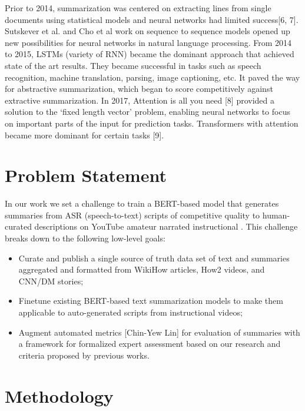 \documentclass{article}
\begin{document}
Prior to 2014, summarization was centered on extracting lines from single documents using statistical models and neural networks had limited success[6, 7]. Sutskever et al. and Cho et al work on sequence to sequence models opened up new possibilities for neural networks in natural language processing. From 2014 to 2015, LSTMs (variety of RNN) became the dominant approach that achieved state of the art results. They became successful in tasks such as speech recognition, machine translation, parsing, image captioning, etc. It paved the way for abstractive summarization, which began to score competitively against extractive summarization. In 2017, Attention is all you need [8] provided a solution to the ‘fixed length vector’ problem, enabling neural networks to focus on important parts of the input for prediction tasks. Transformers with attention became more dominant for certain tasks [9].

\section{Problem Statement}

In our work we set a challenge to train a BERT-based model  that generates summaries from ASR (speech-to-text) scripts of competitive quality to human-curated descriptions on YouTube amateur narrated instructional . This challenge breaks down to the following low-level goals:
\begin{itemize}

\item Curate and publish a single source of truth data set of text and summaries aggregated and formatted from WikiHow articles, How2 videos, and CNN/DM stories;
\item Finetune existing BERT-based text summarization models to make them applicable to auto-generated scripts from instructional videos; 
\item Augment automated  metrics [Chin-Yew Lin] for evaluation of summaries with a framework for formalized expert assessment based on our research and criteria proposed by previous works.
\end{itemize}


 
\section{Methodology}
\end{document}
